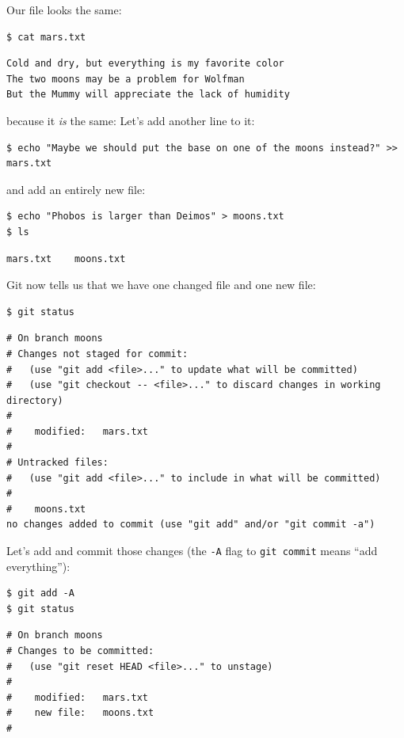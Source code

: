 \documentclass[]{book}
\begin{document}
Our file looks the same:

\begin{verbatim}
$ cat mars.txt
\end{verbatim}

\begin{verbatim}
Cold and dry, but everything is my favorite color
The two moons may be a problem for Wolfman
But the Mummy will appreciate the lack of humidity
\end{verbatim}

because it \emph{is} the same: Let's add another line to it:

\begin{verbatim}
$ echo "Maybe we should put the base on one of the moons instead?" >> mars.txt
\end{verbatim}

and add an entirely new file:

\begin{verbatim}
$ echo "Phobos is larger than Deimos" > moons.txt
$ ls
\end{verbatim}

\begin{verbatim}
mars.txt    moons.txt
\end{verbatim}

Git now tells us that we have one changed file and one new file:

\begin{verbatim}
$ git status
\end{verbatim}

\begin{verbatim}
# On branch moons
# Changes not staged for commit:
#   (use "git add <file>..." to update what will be committed)
#   (use "git checkout -- <file>..." to discard changes in working directory)
#
#    modified:   mars.txt
#
# Untracked files:
#   (use "git add <file>..." to include in what will be committed)
#
#    moons.txt
no changes added to commit (use "git add" and/or "git commit -a")
\end{verbatim}

Let's add and commit those changes (the \texttt{-A} flag to
\texttt{git commit} means ``add everything''):

\begin{verbatim}
$ git add -A
$ git status
\end{verbatim}

\begin{verbatim}
# On branch moons
# Changes to be committed:
#   (use "git reset HEAD <file>..." to unstage)
#
#    modified:   mars.txt
#    new file:   moons.txt
#
\end{verbatim}
\end{document}
